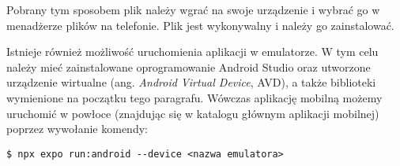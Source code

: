 \documentclass[../main.tex]{subfiles}
\begin{document}
Pobrany tym sposobem plik należy wgrać na swoje urządzenie i wybrać go w menadżerze plików na telefonie. Plik  jest wykonywalny i należy go zainstalować.

Istnieje również możliwość uruchomienia aplikacji w emulatorze. W tym celu należy mieć zainstalowane oprogramowanie Android Studio\cite{android_studio} oraz utworzone urządzenie wirtualne (ang. \textit{Android Virtual Device}, AVD), a także biblioteki wymienione na początku tego paragrafu. Wówczas aplikację mobilną możemy uruchomić w powłoce (znajdując się w katalogu głównym aplikacji mobilnej) poprzez wywołanie komendy:

\begin{lstlisting}[style=BashInputStyle]
    $ npx expo run:android --device <nazwa emulatora>
\end{lstlisting}
\end{document}
